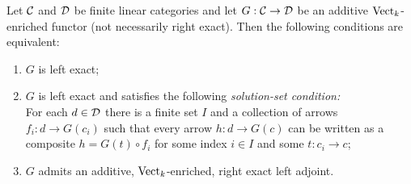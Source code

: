 \documentclass{amsart}
\begin{document}
\begin{proposition} \label{prop:AFT}
	Let $\mathcal C$ and $\mathcal D$ be finite linear categories and let $G: \mathcal C \rightarrow \mathcal D$  be an additive $\mathrm{Vect}_k$-enriched functor (not necessarily right exact). Then the following conditions are equivalent: 
	\begin{enumerate}
		\item $G$ is left exact;  
		\item $G$ is left exact and satisfies the following {\em solution-set condition:} \\  For each $d \in \mathcal D$ there is a finite set $I$ and a collection of arrows $f_i:d \to G(c_i)$ such that every arrow $h:d \to G(c)$ can be written as a composite $h = G(t) \circ f_i$ for some index $i \in I$ and some $t: c_i \to c$; 
		\item $G$ admits an additive, ${\mathrm{Vect}_k}$-enriched, right exact left adjoint.
	\end{enumerate}
\end{proposition}
\end{document}
